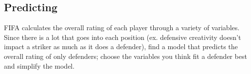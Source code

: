 \documentclass[
  letterpaper,
  DIV=11,
  numbers=noendperiod]{scrartcl}
\begin{document}
\hypertarget{predicting}{%
\subsection{Predicting}\label{predicting}}

FIFA calculates the overall rating of each player through a variety of
variables. Since there is a lot that goes into each position (ex.
defensive creativity doesn't impact a striker as much as it does a
defender), find a model that predicts the overall rating of only
defenders; choose the variables you think fit a defender best and
simplify the model.
\end{document}
